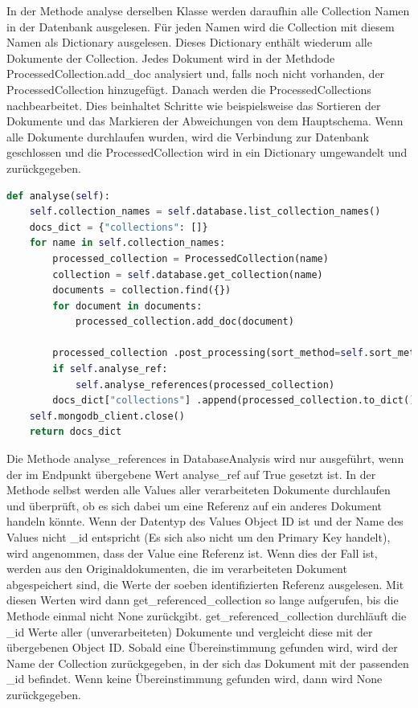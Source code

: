 In der Methode analyse derselben Klasse werden daraufhin alle Collection Namen in der Datenbank ausgelesen.
Für jeden Namen wird die Collection mit diesem Namen als Dictionary ausgelesen.
Dieses Dictionary enthält wiederum alle Dokumente der Collection.
Jedes Dokument wird in der Methdode ProcessedCollection.add\_doc analysiert und, falls noch nicht vorhanden, der ProcessedCollection hinzugefügt.
Danach werden die ProcessedCollections nachbearbeitet.
Dies beinhaltet Schritte wie beispielsweise das Sortieren der Dokumente und das Markieren der Abweichungen von dem Hauptschema.
Wenn alle Dokumente durchlaufen wurden, wird die Verbindung zur Datenbank geschlossen und die ProcessedCollection wird in ein Dictionary umgewandelt und zurückgegeben.

\begin{lstlisting}[language=python, caption={DatabaseAnalysis.analyse},label={lst:backend_analyse}]
def analyse(self):
    self.collection_names = self.database.list_collection_names()
    docs_dict = {"collections": []}
    for name in self.collection_names:
        processed_collection = ProcessedCollection(name)
        collection = self.database.get_collection(name)
        documents = collection.find({})
        for document in documents:
            processed_collection.add_doc(document)

        processed_collection .post_processing(sort_method=self.sort_method)
        if self.analyse_ref:
            self.analyse_references(processed_collection)
        docs_dict["collections"] .append(processed_collection.to_dict())
    self.mongodb_client.close()
    return docs_dict
\end{lstlisting}

Die Methode analyse\_references in DatabaseAnalysis wird nur ausgeführt, wenn der im Endpunkt übergebene Wert analyse\_ref auf True gesetzt ist.
In der Methode selbst werden alle Values aller verarbeiteten Dokumente durchlaufen und überprüft, ob es sich dabei um eine Referenz auf ein anderes Dokument handeln könnte.
Wenn der Datentyp des Values Object ID ist und der Name des Values nicht \_id entspricht (Es sich also nicht um den Primary Key handelt), wird angenommen, dass der Value eine Referenz ist.
Wenn dies der Fall ist, werden aus den Originaldokumenten, die im verarbeiteten Dokument abgespeichert sind, die Werte der soeben identifizierten Referenz ausgelesen.
Mit diesen Werten wird dann get\_referenced\_collection so lange aufgerufen, bis die Methode einmal nicht None zurückgibt.
get\_referenced\_collection durchläuft die \_id Werte aller (unverarbeiteten) Dokumente und vergleicht diese mit der übergebenen Object ID.
Sobald eine Übereinstimmung gefunden wird, wird der Name der Collection zurückgegeben, in der sich das Dokument mit der passenden \_id befindet.
Wenn keine Übereinstimmung gefunden wird, dann wird None zurückgegeben.

